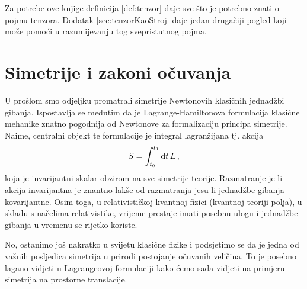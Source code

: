 Za potrebe ove knjige definicija \ref{def:tenzor} daje sve što
je potrebno znati o pojmu tenzora. Dodatak \ref{sec:tenzorKaoStroj} daje
jedan drugačiji pogled koji može pomoći u razumijevanju tog
svepristutnog pojma.


\section{Simetrije i zakoni očuvanja}
\label{sec:noether}

U prošlom smo odjeljku promatrali simetrije Newtonovih klasičnih jednadžbi
gibanja. Ispostavlja se međutim da je
Lagrange-Hamiltonova formulacija klasične mehanike znatno pogodnija od
Newtonove za formalizaciju principa simetrije. 
Naime, centralni objekt te formulacije je integral lagranžijana tj. akcija
\begin{equation}
S = \int_{t_0}^{t_1} \textrm{d} t\, L \,,
\label{eq:akcija}
\end{equation}
koja je invarijantni skalar obzirom na sve simetrije teorije. Razmatranje
je li akcija invarijantna je znantno lakše od razmatranja jesu li jednadžbe
gibanja kovarijantne. Osim toga, u relativističkoj kvantnoj fizici
(kvantnoj teoriji polja), u skladu s načelima relativistike,
vrijeme prestaje imati posebnu ulogu i jednadžbe gibanja
u vremenu se rijetko koriste. 

No, ostanimo još nakratko u svijetu klasične fizike i podsjetimo se da je jedna
od važnih posljedica simetrija u prirodi postojanje očuvanih veličina.
To je posebno lagano vidjeti u Lagrangeovoj formulaciji kako ćemo sada
vidjeti na primjeru simetrija na prostorne translacije.

